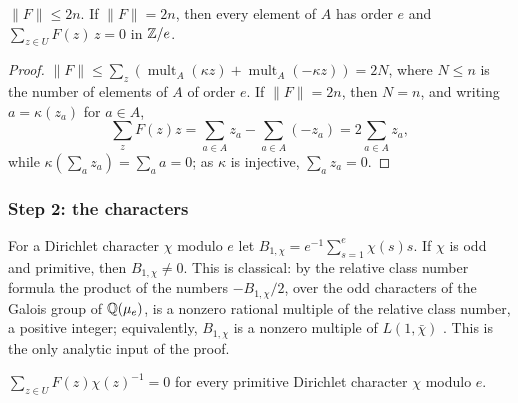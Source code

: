 \begin{lemma}\label{lem:countF}
$\|F\|\le2n$. If $\|F\|=2n$, then every element of $A$ has order $e$ and
$\sum_{z\in U}F(z)\,z=0$ in $\mathbb{Z}/e$.
\end{lemma}

\begin{proof}
$\|F\|\le\sum_{z}(\operatorname{mult}_{A}(\kappa z)+\operatorname{mult}_{A}
(-\kappa z))=2N$, where $N\le n$ is the number of elements of $A$ of order
$e$. If $\|F\|=2n$, then $N=n$, and writing $a=\kappa(z_{a})$ for $a\in A$,
\[
  \sum_{z}F(z)z=\sum_{a\in A}z_{a}-\sum_{a\in A}(-z_{a})=2\sum_{a\in
  A}z_{a},
\]
while $\kappa(\sum_{a}z_{a})=\sum_{a}a=0$; as $\kappa$ is injective,
$\sum_{a}z_{a}=0$.
\end{proof}

\subsubsection*{Step 2: the characters}
For a Dirichlet character $\chi$ modulo $e$ let $B_{1,\chi}=e^{-1}\sum_{s=1}
^{e}\chi(s)s$. If $\chi$ is odd and primitive, then $B_{1,\chi}\ne0$. This is
classical: by the relative class number formula \cite[Theorem~4.17]{Was97}
the product of the numbers $-B_{1,\chi}/2$, over the odd characters of the
Galois group of $\mathbb{Q}(\mu_{e})$, is a nonzero rational multiple of the relative
class number, a positive integer; equivalently, $B_{1,\chi}$ is a nonzero
multiple of $L(1,\bar\chi)$ \cite[Theorem~4.9]{Was97}. This is the only
analytic input of the proof.

\begin{lemma}\label{lem:charstep}
$\sum_{z\in U}F(z)\chi(z)^{-1}=0$ for every primitive Dirichlet character
$\chi$ modulo $e$.
\end{lemma}

